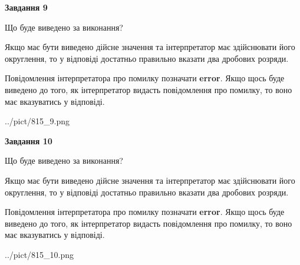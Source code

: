 \documentclass[12pt, ukrainian]{article}
\begin{document}
{\begin {Large}
{\begin {center}\textbf{Завдання 9}\end {center}}\par
Що буде виведено за виконання? \par

Якщо має бути виведено дійсне значення та інтерпретатор має здійснювати його округлення, 
то у відповіді достатньо правильно вказати два дробових розряди.

Повідомлення інтерпретатора про помилку позначати \textbf{error}.
Якщо щось буде виведено до того, як інтерпретатор видасть повідомлення про помилку, 
то воно має вказуватись у відповіді. \par

\begin{center}
	{../pict/815_9.png}
\end{center}
\newpage

{\begin {center}\textbf{Завдання 10}\end {center}}\par
Що буде виведено за виконання? \par

Якщо має бути виведено дійсне значення та інтерпретатор має здійснювати його округлення, 
то у відповіді достатньо правильно вказати два дробових розряди.

Повідомлення інтерпретатора про помилку позначати \textbf{error}.
Якщо щось буде виведено до того, як інтерпретатор видасть повідомлення про помилку, 
то воно має вказуватись у відповіді. \par

\begin{center}
	{../pict/815_10.png}
\end{center}
\newpage

\end {Large}}
\end{document}
